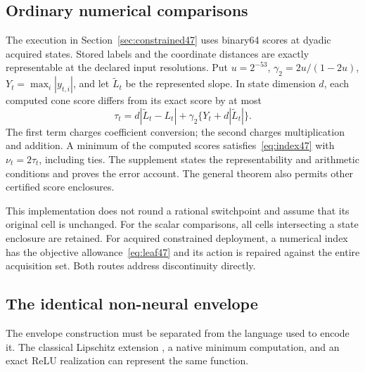 \subsection{Ordinary numerical comparisons}
The execution in Section~\ref{sec:constrained47} uses binary64 scores at dyadic acquired states. Stored labels and the coordinate distances are exactly representable at the declared input resolutions. Put $u=2^{-53}$, $\gamma_2=2u/(1-2u)$, $Y_t=\max_i|y_{t,i}|$, and let $\widetilde L_t$ be the represented slope. In state dimension $d$, each computed cone score differs from its exact score by at most
\begin{equation}\label{eq:leaf47}
 \tau_t=d|\widetilde L_t-L_t|+
        \gamma_2\{Y_t+d|\widetilde L_t|\}.
\end{equation}
The first term charges coefficient conversion; the second charges multiplication and addition. A minimum of the computed scores satisfies~\eqref{eq:index47} with $\nu_t=2\tau_t$, including ties. The supplement states the representability and arithmetic conditions and proves the error account. The general theorem also permits other certified score enclosures.

This implementation does not round a rational switchpoint and assume that its original cell is unchanged. For the scalar comparisons, all cells intersecting a state enclosure are retained. For acquired constrained deployment, a numerical index has the objective allowance~\eqref{eq:leaf47} and its action is repaired against the entire acquisition set. Both routes address discontinuity directly.

\subsection{The identical non-neural envelope}
The envelope construction must be separated from the language used to encode it. The classical Lipschitz extension \citep{mcshane1934}, a native minimum computation, and an exact ReLU realization can represent the same function.

